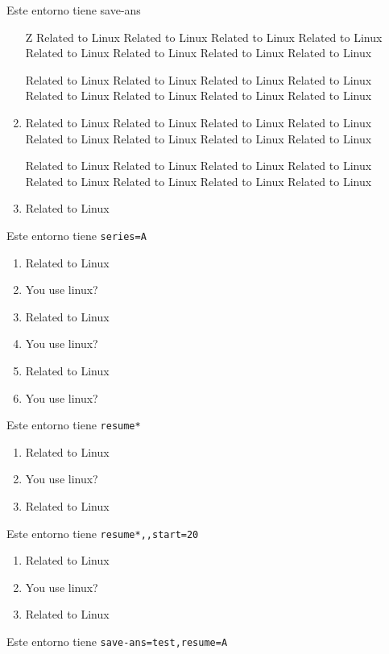 \documentclass{article}
\begin{document}
Este entorno tiene save-ans
\begin{enumerate}[nosep,itemindent=2cm, labelsep=4cm]
  \item[Z] Related to Linux Related to Linux Related to Linux Related to Linux
  Related to Linux Related to Linux Related to Linux Related to Linux

  Related to Linux Related to Linux Related to Linux Related to Linux
  Related to Linux Related to Linux Related to Linux Related to Linux

  \item Related to Linux Related to Linux Related to Linux Related to Linux
  Related to Linux Related to Linux Related to Linux Related to Linux

  Related to Linux Related to Linux Related to Linux Related to Linux
  Related to Linux Related to Linux Related to Linux Related to Linux
  \item Related to Linux
\end{enumerate}

Este entorno tiene \verb+series=A+
\begin{enumerate}[label=\Roman*, nosep, series=A]
  \item Related to Linux
  \item You use linux? %
  \item Related to Linux
  \item You use linux? %
  \item Related to Linux
  \item You use linux? %
\end{enumerate}

Este entorno tiene \verb+resume*+
\begin{enumerate}[resume*]
  \item Related to Linux
  \item You use linux? %
  \item Related to Linux
\end{enumerate}


Este entorno tiene \verb+resume*,,start=20+
\begin{enumerate}[resume*,start=20]
  \item Related to Linux
  \item You use linux? %
  \item Related to Linux
\end{enumerate}

Este entorno tiene \verb+save-ans=test,resume=A+
\end{document}
